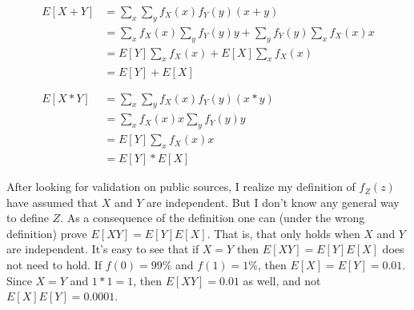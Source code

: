 \documentclass[a4paper,11pt]{article}
\begin{document}
\begin{align*}
 E[X+Y] &= \sum_x \sum_y f_X(x)f_Y(y)(x+y) \\
        &= \sum_x f_X(x) \sum_y f_Y(y)y + \sum_y f_Y(y) \sum_x f_X(x)x \\
        &= E[Y]\sum_x f_X(x) + E[X]\sum_x f_X(x) \\
        &= E[Y] + E[X]\\
\\
\\
 E[X*Y] &= \sum_x \sum_y f_X(x)f_Y(y)(x*y) \\
        &= \sum_x f_X(x)x \sum_y f_Y(y)y \\
        &= E[Y]\sum_x f_X(x)x \\
        &= E[Y] * E[X]
\end{align*}

After looking for validation on public sources, I realize my definition
of $f_Z(z)$ have assumed that $X$ and $Y$ are independent. 
But I don't know any general way to define $Z$. As a consequence of
the definition one can (under the wrong definition)
prove $E[XY] = E[Y]  E[X]$. That is, that only holds when $X$ and $Y$
are independent. It's easy to see that if $X = Y$ then $E[XY] = E[Y]  E[X]$
does not need to hold. If $f(0) = 99\%$ and $f(1) = 1\%$, then
$E[X] = E[Y] = 0.01$. Since $X = Y$ and $1*1=1$, then $E[XY] = 0.01$ as well,
and not $E[X]E[Y]=0.0001$.
\end{document}

